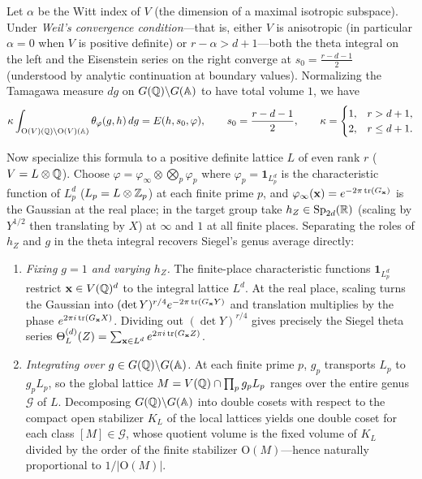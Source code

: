 \begin{theorem}
Let $\alpha$ be the Witt index of $V$ (the dimension of a maximal isotropic subspace). Under \emph{Weil's convergence condition}---that is, either $V$ is anisotropic (in particular $\alpha=0$ when $V$ is positive definite) or $r-\alpha>d+1$---both the theta integral on the left and the Eisenstein series on the right converge at $s_0=\frac{r-d-1}{2}$ (understood by analytic continuation at boundary values). Normalizing the Tamagawa measure $dg$ on $G(\mathbb{Q})\backslash G(\mathbb{A})$ to have total volume $1$, we have
\[
\kappa\int_{\mathrm O(V)(\mathbb{Q})\backslash\mathrm O(V)(\mathbb{A})}\theta_\varphi(g,h)\,dg
=E(h,s_0,\varphi),
\qquad
s_0=\frac{r-d-1}{2},
\qquad
\kappa=\begin{cases} 1, & r>d+1,\\ 2, & r\le d+1. \end{cases}
\]
\end{theorem}

Now specialize this formula to a positive definite lattice $L$ of even rank $r$ ($V=L\otimes\mathbb{Q}$). Choose $\varphi=\varphi_\infty\otimes\bigotimes_p\varphi_p$ where $\varphi_p=\mathbf 1_{L_p^d}$ is the characteristic function of $L_p^d$ ($L_p=L\otimes\mathbb{Z}_p$) at each finite prime $p$, and $\varphi_\infty(\mathbf x)=e^{-2\pi\operatorname{tr}(G_{\mathbf x})}$ is the Gaussian at the real place; in the target group take $h_Z\in\mathrm{Sp}_{2d}(\mathbb{R})$ (scaling by $Y^{1/2}$ then translating by $X$) at $\infty$ and $1$ at all finite places. Separating the roles of $h_Z$ and $g$ in the theta integral recovers Siegel's genus average directly:
\begin{enumerate}
\item \emph{Fixing $g=1$ and varying $h_Z$.} The finite-place characteristic functions $\mathbf 1_{L_p^d}$ restrict $\mathbf x\in V(\mathbb{Q})^d$ to the integral lattice $L^d$. At the real place, scaling turns the Gaussian into $(\det Y)^{r/4}e^{-2\pi\operatorname{tr}(G_{\mathbf x}Y)}$ and translation multiplies by the phase $e^{2\pi i\operatorname{tr}(G_{\mathbf x}X)}$. Dividing out $(\det Y)^{r/4}$ gives precisely the Siegel theta series $\Theta_L^{(d)}(Z)=\sum_{\mathbf x\in L^d}e^{2\pi i\operatorname{tr}(G_{\mathbf x}Z)}$.
\item \emph{Integrating over $g\in G(\mathbb{Q})\backslash G(\mathbb{A})$.} At each finite prime $p$, $g_p$ transports $L_p$ to $g_p L_p$, so the global lattice $M=V(\mathbb{Q})\cap\prod_p g_p L_p$ ranges over the entire genus $\mathcal G$ of $L$. Decomposing $G(\mathbb{Q})\backslash G(\mathbb{A})$ into double cosets with respect to the compact open stabilizer $K_L$ of the local lattices yields one double coset for each class $[M]\in\mathcal G$, whose quotient volume is the fixed volume of $K_L$ divided by the order of the finite stabilizer $\mathrm O(M)$---hence naturally proportional to $1/|\mathrm O(M)|$.
\end{enumerate}

